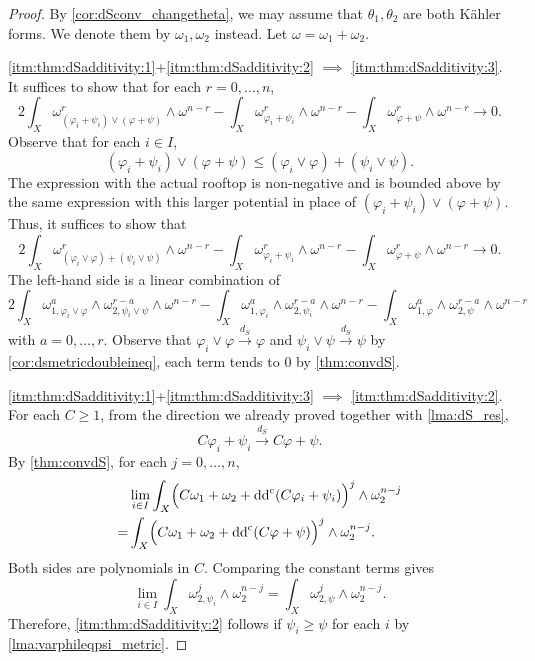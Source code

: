 \begin{proof}
By \cref{cor:dSconv_changetheta}, we may assume that $\theta_1,\theta_2$ are both Kähler forms. We denote them by $\omega_1,\omega_2$ instead. Let $\omega=\omega_1+\omega_2$.

\ref{itm:thm:dSadditivity:1}+\ref{itm:thm:dSadditivity:2} $\implies$ \ref{itm:thm:dSadditivity:3}.
	It suffices to show that for each $r=0,\ldots,n$,
	\[
		2\int_X \omega_{(\varphi_i+\psi_i)\lor(\varphi+\psi)}^r\wedge \omega^{n-r}-\int_X \omega_{\varphi_i+\psi_i}^r\wedge \omega^{n-r}-\int_X \omega_{\varphi+\psi}^r\wedge\omega^{n-r}\to 0.
	\]
	Observe that for each $i\in I$,
	\[
		(\varphi_i+\psi_i)\lor (\varphi+\psi)\leq (\varphi_i\lor \varphi)+(\psi_i \lor \psi).
	\]
	The expression with the actual rooftop is non-negative and is bounded above by the same expression with this larger potential in place of $(\varphi_i+\psi_i)\lor(\varphi+\psi)$. Thus, it suffices to show that
	\[
		2\int_X \omega_{(\varphi_i\lor \varphi)+(\psi_i\lor \psi)}^r\wedge \omega^{n-r}-\int_X \omega_{\varphi_i+\psi_i}^r\wedge \omega^{n-r}-\int_X \omega_{\varphi+\psi}^r\wedge\omega^{n-r}\to 0.
	\]
	The left-hand side is a linear combination of
	\[
		2\int_X \omega_{1,\varphi_i\lor\varphi}^a\wedge \omega_{2,\psi_i\lor\psi}^{r-a}\wedge \omega^{n-r}-\int_X \omega_{1,\varphi_i}^a\wedge \omega_{2,\psi_i}^{r-a} \wedge \omega^{n-r}-\int_X \omega_{1,\varphi}^a\wedge \omega_{2,\psi}^{r-a} \wedge \omega^{n-r}
	\]
	with $a=0,\ldots,r$. Observe that $\varphi_i\lor\varphi\xrightarrow{d_S}\varphi$ and $\psi_i\lor\psi\xrightarrow{d_S}\psi$ by \cref{cor:dsmetricdoubleineq}, each term tends to $0$ by \cref{thm:convdS}.


\ref{itm:thm:dSadditivity:1}+\ref{itm:thm:dSadditivity:3} $\implies$ \ref{itm:thm:dSadditivity:2}. For each $C\geq 1$, from the direction we already proved together with \cref{lma:dS_res},
    \[
    C\varphi_i+\psi_i\xrightarrow{d_{S}} C\varphi+\psi.
    \]
By \cref{thm:convdS}, for each $j=0,\ldots,n$,
\[
\begin{split}
&\lim_{i\in I} \int_X \Bigl(C\omega_1+\omega_2+\mathrm{dd}^{\mathrm{c}}(C\varphi_i+\psi_i)\Bigr)^j\wedge \omega_2^{n-j}\\
= &\int_X \Bigl(C\omega_1+\omega_2+\mathrm{dd}^{\mathrm{c}}(C\varphi+\psi)\Bigr)^j\wedge \omega_2^{n-j}.
\end{split}
\]
Both sides are polynomials in $C$. Comparing the constant terms gives
\begin{equation}\label{eq:psii_quant_conv}
\lim_{i\in I} \int_X \omega_{2,\psi_i}^j\wedge \omega_2^{n-j}=\int_X \omega_{2,\psi}^j\wedge \omega_2^{n-j}.
\end{equation}
Therefore, \ref{itm:thm:dSadditivity:2} follows if $\psi_i\geq \psi$ for each $i$ by \cref{lma:varphileqpsi_metric}.


\end{proof}
